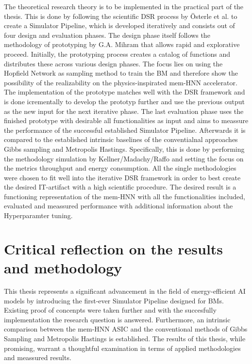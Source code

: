 The theoretical research theory is to be implemented in the practical part of the thesis.
This is done by following the scientific \ac{DSR} process by Österle et al. to create a Simulator Pipeline,
which is developed iteratively and consists out of four design and evaluation phases. 
The design phase itself follows the methodology of prototyping by G.A. Mihram that allows rapid and explorative proceed.
Initially, the prototyping process creates a catalog of functions and distributes these across various design phases.
The focus lies on using the Hopfield Network as sampling method to train the \ac{BM}
and therefore show the possibility of the realizability on the physics-inspirated \ac{mem-HNN} accelerator.
The implementation of the prototype matches well with the \ac{DSR} framework and is done icrementally to develop the prototyp further and use the previous output as
the new input for the next iterative phase.   
The last evaluation phase uses the finished prototype with desirable all functionalities as input and 
aims to meassure the performance of the successful established Simulator Pipeline. 
Afterwards it is compared to the established intrinsic baselines
of the conventialnal approaches Gibbs sampling and Metropolis Hastings.
Specifically, this is done by performing the methodology simulation by Kellner/Madachy/Raffo and setting the focus on 
the metrics throughput and energy consumption. 
All the single methodologies were chosen to fit well into the iterative \ac{DSR} framework in order to best 
create the desired \ac{IT}-artifact with a high scientific procedure.
The desired result is a functioning representation of the \ac{mem-HNN} with all the functionalities included, 
evaluated and meassured performance with additional information about the Hyperparamter tuning.

\section{Critical reflection on the results and methodology}

This thesis represents a significant advancement in the field of energy-efficient AI models by introducing the first-ever Simulator Pipeline designed for \ac{BM}s.
Existing proof of concenpts were taken further and with the succesfully implementation the research question is answered.
Furthermore, an intrinsic comparison between the \ac{mem-HNN} \ac{ASIC} and the conventional methods of Gibbs Sampling and Metropolis Hastings is established.
The results of this thesis, while promising, warrant a thoughtful examination in terms of applied methodologies and meassured results.

